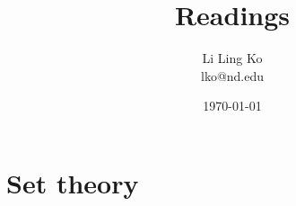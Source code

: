 \documentclass{article}
\begin{document}
\title{Readings}
\author{Li Ling Ko\\ lko@nd.edu}
\date{\today}
\maketitle

%
%
%
%
%
%
\section{Set theory}

\end{document}
